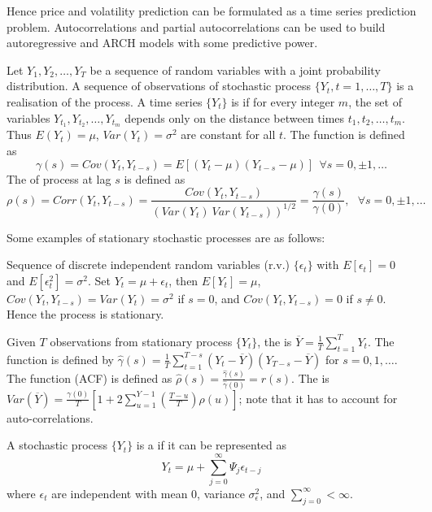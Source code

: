 Hence price and volatility prediction can be formulated as a time series prediction problem. Autocorrelations and partial autocorrelations can be used to build autoregressive and ARCH models with some predictive power.

Let $Y_1, Y_2, \ldots, Y_T$ be a sequence of random variables with a joint probability distribution. A sequence of observations of stochastic process $\{Y_t, t = 1, \ldots, T\}$ is a realisation of the process.
A time series $\{Y_t\}$ is  if for every integer $m$, the set of variables $Y_{t_1}, Y_{t_2}, \ldots, Y_{t_m}$ depends only on the distance between times $t_1, t_2, \ldots, t_m$. Thus $E(Y_t) = \mu$, $Var(Y_t) = \sigma^2$ are constant for all $t$.
The  function is defined as
\begin{equation*}
\gamma(s) = Cov(Y_t, Y_{t-s}) = E[(Y_t - \mu)(Y_{t-s} - \mu)] \ \ \forall s = 0, \pm 1, \ldots \nonumber
\end{equation*}
The  of process at lag $s$ is defined as
\begin{equation*}
\rho(s) = Corr(Y_t, Y_{t-s}) = \frac{Cov(Y_t, Y_{t-s})}{\left(Var(Y_t) \ Var(Y_{t-s}) \right)^{1/2}} = \frac{\gamma(s)}{\gamma(0)}, \ \ \ \forall s = 0, \pm 1, \ldots \nonumber
\end{equation*}

Some examples of stationary stochastic processes are as follows:

\begin{example}  Sequence of discrete independent random variables (r.v.) $\{\epsilon_t \}$ with $E[\epsilon_t] = 0$ and $E[\epsilon_t^2] = \sigma^2$. Set $Y_t = \mu + \epsilon_t$, then $E[Y_t] = \mu$, $Cov(Y_t, Y_{t-s}) = Var(Y_t) = \sigma^2$ if $s=0$, and $Cov(Y_t, Y_{t-s}) = 0$ if $s \neq 0$. Hence the process is stationary.
\end{example}

Given $T$ observations from stationary process $\{Y_t\}$, the  is $\overline{Y} = \frac{1}{T} \sum\limits_{t=1}^T Y_t$. The  function is defined by $\hat{\gamma}(s) = \frac{1}{T} \sum\limits_{t=1}^{T-s} (Y_t - \overline{Y})(Y_{T-s} - \overline{Y})$ for $s=0, 1, \ldots$. The  function (ACF) is defined as $\hat{\rho}(s) = \frac{\hat{\gamma}(s)}{\hat{\gamma}(0)} = r(s)$. The  is $Var(\overline{Y}) = \frac{\gamma(0)}{T}\left[1 + 2 \sum\limits_{u=1}^{Y-1} \left(\frac{T-u}{T} \right) \rho(u) \right]$; note that it has to account for auto-correlations.

\begin{definition} A stochastic process $\{Y_t\}$ is a  if it can be represented as
\begin{equation*}
Y_t = \mu + \sum\limits_{j=0}^{\infty} \Psi_j \epsilon_{t-j} \nonumber
\end{equation*}
where $\epsilon_t$ are independent with mean $0$, variance $\sigma_{\epsilon}^2$, and $\sum\limits_{j=0}^{\infty} < \infty$.
\end{definition}
